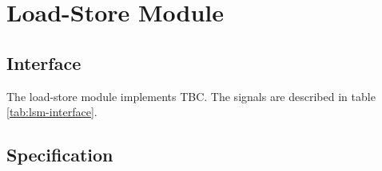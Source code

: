 \section{Load-Store Module}

  \subsection{Interface}

    \begin{content}
        The load-store module implements TBC. The signals are described in table \ref{tab:lsm-interface}. 
      \end{content}

    

  \subsection{Specification}

\newpage
